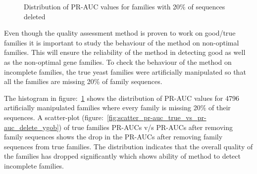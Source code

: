 \documentclass{article}
\begin{document}
		\begin{figure}
			\caption{Distribution of PR-AUC values for families with 20\% of sequences deleted}
			\label{fig:hist_pr-auc_delete_ygob}
		\end{figure}
		
		Even though the quality assessment method is proven to work on good/true families it is important to study the behaviour of the method on non-optimal families. This will ensure the reliability of the method in detecting good as well as the non-optimal gene families. To check the behaviour of the method on incomplete families, the true yeast families were artificially manipulated so that all the families are missing 20\% of family sequences.
		
		The histogram in figure:~\ref{fig:hist_pr-auc_delete_ygob} shows the distribution of PR-AUC values for 4796 artificially manipulated families where every family is missing 20\% of their sequences. A scatter-plot (figure:~\ref{fig:scatter_pr-auc_true_vs_pr-auc_delete_ygob}) of true families PR-AUCs v/s PR-AUCs after removing family sequences shows the drop in the PR-AUCs after removing family sequences from true families. The distribution indicates that the overall quality of the families has dropped significantly which shows ability of method to detect incomplete families.
		
\end{document}
